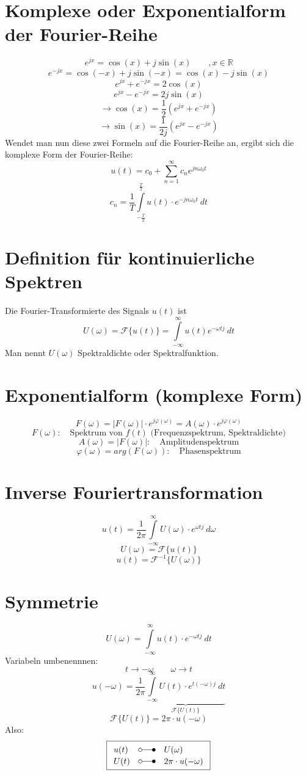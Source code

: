 \section{Komplexe oder Exponentialform der Fourier-Reihe}
\[ e^{j x} = \cos(x) + j \sin(x) \qquad , x \in \mathbb{R} \]
\[ e^{- j x} = \cos(-x) + j \sin(-x) = \cos(x) - j \sin(x) \]
\[ e^{jx} + e^{-jx} = 2 \cos(x) \]
\[ e^{jx} - e^{-jx} = 2 j \sin(x) \]
\[ \to \cos(x) = \frac{1}{2} (e^{jx} + e^{-jx}) \]
\[ \to \sin(x) = \frac{1}{2j} (e^{jx} - e^{-jx}) \]
Wendet man nun diese zwei Formeln auf die Fourier-Reihe an, ergibt sich die komplexe Form der Fourier-Reihe:
\[ u(t) = c_0 + \sum\limits_{n = 1}^{\infty} c_n e^{j n \omega_0 t} \]
\[ c_n = \frac{1}{T} \int\limits_{-\frac{T}{2}}^{\frac{T}{2}} 
u(t) \cdot e^{-j n \omega_0 t} ~ dt \]



\section{Definition für kontinuierliche Spektren}
 Die Fourier-Transformierte des Signals $u(t)$ ist 
\[ U(\omega) = \mathcal{F}\{ u(t) \} = \int\limits_{-\infty}^{\infty} 
u(t) e^{-\omega t j} ~dt \]
Man nennt $U(\omega)$ Spektraldichte oder Spektralfunktion. 

\section{Exponentialform (komplexe Form)}
\[ \boxed{F(\omega) = |F(\omega)| \cdot e^{j\varphi(\omega)} = A(\omega) \cdot e^{j\varphi(\omega)}}   \]
\[ F(\omega): \quad \text{Spektrum von $f(t)$ (Frequenzspektrum, Spektraldichte)} \]
\[ A(\omega) = |F(\omega)|: \quad \text{Amplitudenspektrum} \]
\[ \varphi (\omega) = arg(F(\omega)): \quad \text{Phasenspektrum} \]

\section{Inverse Fouriertransformation}
\[ u(t) = \frac{1}{2 \pi}  \int\limits_{-\infty}^{\infty} U(\omega) \cdot e^{\omega t j} ~ d\omega \]
\[ U(\omega) = \mathcal{F} \{ u(t) \} \]
\[ u(t) = \mathcal{F}^{-1} \{ U(\omega) \} \]

\section{Symmetrie}
\[ U(\omega) = \int\limits_{-\infty}^{\infty} u(t) \cdot e^{-\omega t j} ~ dt \]
Variabeln umbenennnen: 
\[ t \to -\omega \qquad \omega \to t \]
\[ u(-\omega) = \frac{1}{2 \pi} \underbrace{\int\limits_{-\infty}^{\infty} 
U(t) \cdot e^{t (-\omega) j} ~ dt}_{\mathcal{F} \{ U(t) \}} \]
\[ \mathcal{F} \{ U(t) \} = 2 \pi \cdot u(-\omega) \]
Also: 
\[ \boxed{\begin{array}{lll}
u(t) & \laplace & U(\omega)\\
U(t) & \laplace & 2 \pi \cdot u(-\omega)
\end{array}} \]


